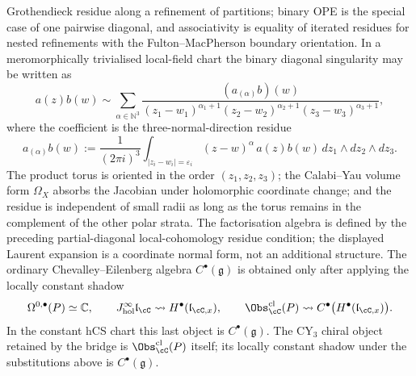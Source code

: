 \begin{definition}
Grothendieck residue along a refinement of partitions; binary OPE is the
special case of one pairwise diagonal, and associativity is equality of
iterated residues for nested refinements with the Fulton--MacPherson
boundary orientation. In a meromorphically trivialised local-field chart
the binary diagonal singularity may be written as
\[
 a(z)b(w)
 \sim
 \sum_{\alpha\in\mathbb N^3}
 \frac{(a_{(\alpha)}b)(w)}
 {(z_1-w_1)^{\alpha_1+1}
 (z_2-w_2)^{\alpha_2+1}
 (z_3-w_3)^{\alpha_3+1}},
\]
where the coefficient is the three-normal-direction residue
\[
 a_{(\alpha)}b(w)
 :=
 \frac{1}{(2\pi i)^3}
 \int_{|z_i-w_i|=\varepsilon_i}
 (z-w)^\alpha\,a(z)b(w)\,
 dz_1\wedge dz_2\wedge dz_3 .
\]
The product torus is oriented in the order $(z_1,z_2,z_3)$; the
Calabi--Yau volume form $\Omega_X$ absorbs the Jacobian under holomorphic
coordinate change; and the residue is independent of small radii as long
as the torus remains in the complement of the other polar strata. The
factorisation algebra is defined by the preceding partial-diagonal
local-cohomology residue condition; the displayed Laurent expansion is a
coordinate normal form, not an additional structure. The ordinary
Chevalley--Eilenberg algebra
$C^\bullet(\mathfrak g)$ is obtained only after applying the locally
constant shadow
\[
 \Omega^{0,\bullet}(P)\simeq \mathbb C,
 \qquad
 J^\infty_{\mathrm{hol}}\mathfrak l_{\cC}\rightsquigarrow
 H^\bullet(\mathfrak l_{\cC,x}),
 \qquad
 \Obs_{\cC}^{\mathrm{cl}}(P)\rightsquigarrow
 C^\bullet\bigl(H^\bullet(\mathfrak l_{\cC,x})\bigr).
\]
In the constant hCS chart this last object is $C^\bullet(\mathfrak g)$.
The CY$_3$ chiral object retained by the bridge is
$\Obs_{\cC}^{\mathrm{cl}}(P)$ itself; its locally constant shadow under
the substitutions above is $C^\bullet(\mathfrak g)$.
\end{definition}

